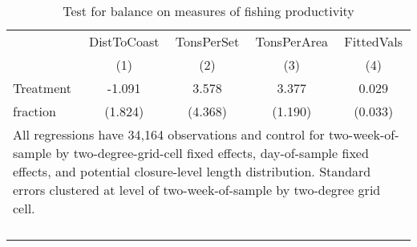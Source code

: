 \begin{table}[tb]
\centering
\caption{Test for balance on measures of fishing productivity} 
\label{balance}
\begin{tabular}{lcccc}
   \toprule   & DistToCoast & TonsPerSet & TonsPerArea & FittedVals \\ 
   & (1) & (2) & (3) & (4) \\ 
   \midrule Treatment & -1.091 & 3.578 & 3.377 & 0.029 \\ 
  fraction & (1.824) & (4.368) & (1.190) & (0.033) \\ 
   \bottomrule \multicolumn{5}{l}{\multirow{2}{13cm}{All regressions have 34,164 observations and control for two-week-of-sample by two-degree-grid-cell fixed effects, day-of-sample fixed effects, and potential closure-level length distribution. Standard errors clustered at level of two-week-of-sample by two-degree grid cell.}} \\\\\\\\\\\\ \end{tabular}
\end{table}
